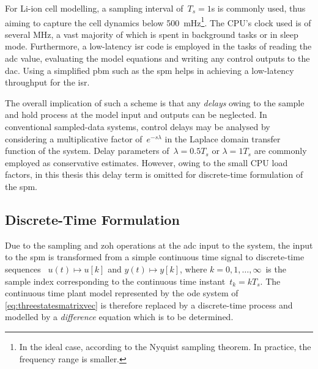 For  Li-ion  cell  modelling,  a  sampling  interval  of~$T_s  =  1$\si{\second}
is   commonly  used,   thus  aiming   to   capture  the   cell  dynamics   below
\SI{500}{\milli\hertz}\footnote{In  the ideal  case,  according  to the  Nyquist
sampling theorem. In practice, the frequency range is smaller.}. The CPU's clock
used is of  several \si{\MHz}, a vast  majority of which is  spent in background
tasks or in sleep mode. Furthermore, a low-latency \gls{isr} code is employed in
the tasks  of reading the  \gls{adc} value,  evaluating the model  equations and
writing any control outputs to the  \gls{dac}. Using a simplified \gls{pbm} such
as the \gls{spm} helps in achieving a low-latency throughput for the \gls{isr}.

The overall implication of such a scheme  is that any \emph{delays} owing to the
sample and  hold process  at the model  input and outputs  can be  neglected. In
conventional sampled-data systems, control delays may be analysed by considering
a multiplicative factor of~$e^{-sλ}$ in the Laplace domain transfer function of
the system. Delay parameters of~${λ = 0.5  T_s}$ or ${λ = 1 T_s}$ are commonly
employed  as  conservative estimates.  However,  owing  to  the small  CPU  load
factors, in this thesis this delay term is omitted for discrete-time formulation
of the \gls{spm}.

\subsection{Discrete-Time  Formulation}


Due  to the  sampling and  \gls{zoh} operations  at the  \gls{adc} input  to the
system,  the input  to the  \gls{spm} is  transformed from  a simple  continuous
time  signal to  discrete-time sequences  \ie~${u(t) \mapsto  u[k]}$ and  ${y(t)
\mapsto y[k]}$,  where ${k =  0,1,\dots,∞}$~is the sample  index corresponding
to  the  continuous time  instant~${t_k  =  kT_s}$.  The continuous  time  plant
model  represented by  the  \gls{ode}  system of  \cref{eq:threestatesmatrixvec}
is  therefore   replaced  by   a  discrete-time  process   and  modelled   by  a
\emph{difference} equation which is to be determined.


